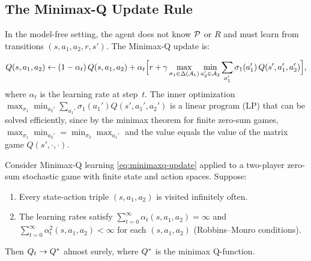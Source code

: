 \documentclass[11pt,a4paper]{article}
\begin{document}
\subsection{The Minimax-Q Update Rule}

In the model-free setting, the agent does not know $\mathcal{P}$ or $R$ and
must learn from transitions $(s, a_1, a_2, r, s')$.  The Minimax-Q
update is:

\begin{equation}
\label{eq:minimaxq-update}
  Q(s, a_1, a_2)
  \leftarrow (1 - \alpha_t)\, Q(s, a_1, a_2)
  + \alpha_t \Bigl[ r + \gamma
    \max_{\sigma_1 \in \Delta(\mathcal{A}_1)}
    \min_{a_2' \in \mathcal{A}_2}
    \sum_{a_1'} \sigma_1(a_1')\, Q(s', a_1', a_2') \Bigr],
\end{equation}
where $\alpha_t$ is the learning rate at step~$t$.  The inner
optimization $\max_{\sigma_1} \min_{a_2'} \sum_{a_1'} \sigma_1(a_1')
Q(s', a_1', a_2')$ is a linear program (LP) that can be solved
efficiently, since by the minimax theorem for finite zero-sum games,
$\max_{\sigma_1} \min_{a_2'} = \min_{\sigma_2} \max_{a_1'}$ and the
value equals the value of the matrix game $Q(s', \cdot, \cdot)$.

\begin{theorem}
\label{thm:minimaxq-convergence}
Consider Minimax-Q learning \eqref{eq:minimaxq-update} applied to a
two-player zero-sum stochastic game with finite state and action spaces.
Suppose:
\begin{enumerate}[label=(\roman*)]
  \item Every state-action triple $(s, a_1, a_2)$ is visited infinitely
    often.
  \item The learning rates satisfy $\sum_{t=0}^\infty \alpha_t(s,a_1,a_2)
    = \infty$ and $\sum_{t=0}^\infty \alpha_t^2(s,a_1,a_2) < \infty$
    for each $(s, a_1, a_2)$ (Robbins--Monro conditions).
\end{enumerate}
Then $Q_t \to Q^*$ almost surely, where $Q^*$ is the minimax
Q-function.
\end{theorem}
\end{document}
